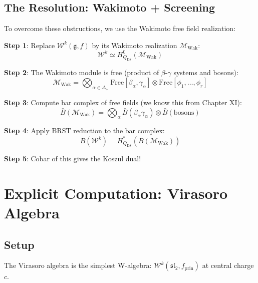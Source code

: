 \subsection{The Resolution: Wakimoto + Screening}

\begin{strategy}
To overcome these obstructions, we use the Wakimoto free field realization:

\textbf{Step 1}: Replace $\mathcal{W}^k(\mathfrak{g}, f)$ by its Wakimoto realization $\mathcal{M}_{\text{Wak}}$:
\begin{equation}
\mathcal{W}^k \simeq H^0_{Q_{\text{DS}}}(\mathcal{M}_{\text{Wak}})
\end{equation}

\textbf{Step 2}: The Wakimoto module is free (product of $\beta$-$\gamma$ systems and bosons):
\begin{equation}
\mathcal{M}_{\text{Wak}} = \bigotimes_{\alpha \in \Delta_+} \text{Free}[\beta_\alpha, \gamma_\alpha] \otimes \text{Free}[\phi_1, \ldots, \phi_r]
\end{equation}

\textbf{Step 3}: Compute bar complex of free fields (we know this from Chapter XI):
\begin{equation}
\bar{B}(\mathcal{M}_{\text{Wak}}) = \bigotimes_\alpha \bar{B}(\beta_\alpha\gamma_\alpha) \otimes \bar{B}(\text{bosons})
\end{equation}

\textbf{Step 4}: Apply BRST reduction to the bar complex:
\begin{equation}
\bar{B}(\mathcal{W}^k) = H^*_{Q_{\text{DS}}}(\bar{B}(\mathcal{M}_{\text{Wak}}))
\end{equation}

\textbf{Step 5}: Cobar of this gives the Koszul dual!
\end{strategy}

\section{Explicit Computation: Virasoro Algebra}

\subsection{Setup}

The Virasoro algebra is the simplest W-algebra: $\mathcal{W}^k(\mathfrak{sl}_2, f_{\text{prin}})$ at central charge $c$.

